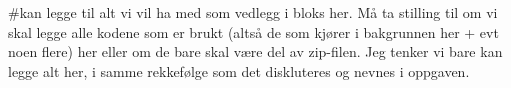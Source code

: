 \documentclass[
  letterpaper,
  DIV=11,
  numbers=noendperiod]{scrartcl}
\newenvironment{Shaded}{\begin{snugshade}}{\end{snugshade}}
\newcommand{\CommentTok}[1]{\textcolor[rgb]{0.37,0.37,0.37}{#1}}
\begin{document}
\begin{Shaded}
\begin{Highlighting}[]
\CommentTok{\#kan legge til alt vi vil ha med som vedlegg i bloks her. Må ta stilling til om vi skal legge alle kodene som er brukt (altså de som kjører i bakgrunnen her + evt noen flere) her eller om de bare skal være del av zip{-}filen. Jeg tenker vi bare kan legge alt her, i samme rekkefølge som det diskluteres og nevnes i oppgaven. }
\end{Highlighting}
\end{Shaded}
\end{document}
